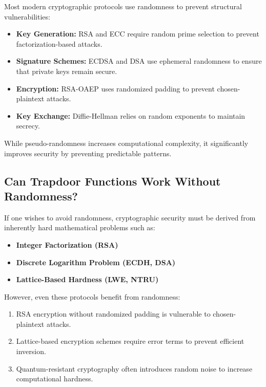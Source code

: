 
Most modern cryptographic protocols use randomness to prevent structural vulnerabilities:

\begin{itemize}
    \item \textbf{Key Generation:} RSA and ECC require random prime selection to prevent factorization-based attacks.
    \item \textbf{Signature Schemes:} ECDSA and DSA use ephemeral randomness to ensure that private keys remain secure.
    \item \textbf{Encryption:} RSA-OAEP uses randomized padding to prevent chosen-plaintext attacks.
    \item \textbf{Key Exchange:} Diffie-Hellman relies on random exponents to maintain secrecy.
\end{itemize}

While pseudo-randomness increases computational complexity, it significantly improves security by preventing predictable patterns.

\subsection{Can Trapdoor Functions Work Without Randomness?}

If one wishes to avoid randomness, cryptographic security must be derived from inherently hard mathematical problems such as:

\begin{itemize}
    \item \textbf{Integer Factorization (RSA)}
    \item \textbf{Discrete Logarithm Problem (ECDH, DSA)}
    \item \textbf{Lattice-Based Hardness (LWE, NTRU)}
\end{itemize}

However, even these protocols benefit from randomness:
\begin{enumerate}
    \item RSA encryption without randomized padding is vulnerable to chosen-plaintext attacks.
    \item Lattice-based encryption schemes require error terms to prevent efficient inversion.
    \item Quantum-resistant cryptography often introduces random noise to increase computational hardness.
\end{enumerate}

